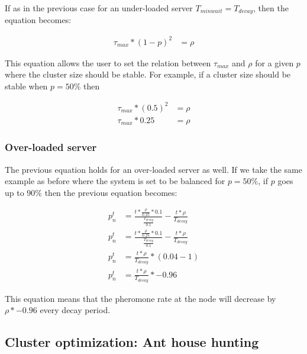 If as in the previous case for an under-loaded server $T_{minwait} = T_{decay}$, then the equation becomes:

\begin{equation}
\begin{aligned}
\tau_{max} * (1 - p)^2 &= \rho
\end{aligned}
\end{equation}

This equation allows the user to set the relation between $\tau_{max}$ and $\rho$ for a given $p$ where the cluster size should be stable. For example, if a cluster size should be stable when $p = 50\%$ then

\begin{equation}
\begin{aligned}
\tau_{max} * (0.5)^2 &= \rho \\
\tau_{max} * 0.25 &= \rho
\end{aligned}
\end{equation}

\subsubsection{Over-loaded server}

The previous equation holds for an over-loaded server as well. If we take the same example as before where the system is set to be balanced for $p = 50\%$, if $p$ goes up to $90\%$ then the previous equation becomes:

\begin{equation}
\begin{aligned}
p^{t}_{n} &= \frac{t *  \frac{\rho}{0.25} * 0.1}{\frac{T_{decay}}{0.1}} - \frac{t *  \rho}{T_{decay}} \\
p^{t}_{n} &= \frac{t *  \frac{\rho}{0.25} * 0.1}{\frac{T_{decay}}{0.1}} - \frac{t *  \rho}{T_{decay}} \\
p^{t}_{n} &= \frac{t * \rho}{T_{decay}} * (0.04 - 1) \\
p^{t}_{n} &= \frac{t * \rho}{T_{decay}} * -0.96
\end{aligned}
\end{equation}

This equation means that the pheromone rate at the node will decrease by $\rho * -0.96$ every decay period.

\subsection{Cluster optimization: Ant house hunting}

